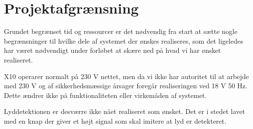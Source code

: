 \chapter{Projektafgrænsning}

Grundet begrænset tid og ressourcer er det nødvendig fra start at sætte nogle begrænsninger til hvilke dele af systemet der ønskes realiseres, som det ligeledes har været nødvendigt under forløbet at skære ned på hvad vi har ønsket realiseret. 

X10 operarer normalt på 230 V nettet, men da vi ikke har autoritet til at arbejde med 230 V og af sikkerhedsmæssige årsager foregår realiseringen ved 18 V 50 Hz. Dette ændrer ikke på funktionaliteten eller virkemåden af systemet. 

Lyddetektionen er desværre ikke nået realiseret som ønsket. Det er i stedet lavet med en knap der giver et højt signal som skal imitere at lyd er detekteret. 

 